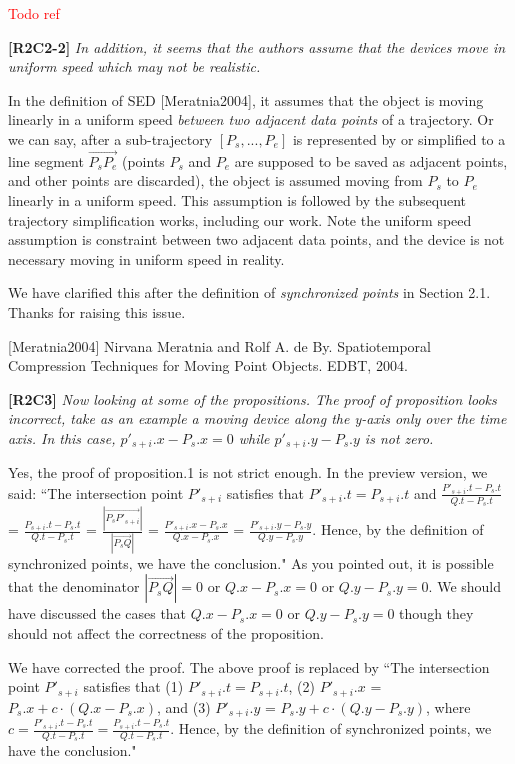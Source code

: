 \documentclass{letter}
\begin{document}
\textcolor{red}{Todo ref}

\textbf{[R2C2-2]} \emph{In addition, it seems that the authors assume that the devices move in uniform speed which may not be realistic.}

In the definition of SED [Meratnia2004], it assumes that the object is moving linearly in a uniform speed \textit{between two adjacent data points} of a trajectory. Or we can say, after a sub-trajectory $[P_s, ..., P_e]$ is represented by or simplified to a line segment $\overrightarrow{P_sP_e}$ (points $P_s$ and $P_e$ are supposed to be saved as adjacent points, and other points are discarded), the object is assumed moving from $P_s$ to $P_e$ linearly in a uniform speed. This assumption is followed by the subsequent trajectory simplification works, including our work. Note the uniform speed assumption is constraint between two adjacent data points, and the device is not necessary moving in uniform speed in reality.

We have clarified this after the definition of \emph{synchronized points} in Section 2.1. Thanks for raising this issue.

[Meratnia2004] Nirvana Meratnia and Rolf A. de By. Spatiotemporal Compression Techniques for Moving Point Objects. EDBT, 2004.


\textbf{[R2C3]} \emph{Now looking at some of the propositions.
The proof of proposition looks incorrect, take as an example a moving device along the y-axis only over the time axis. In this case, $p'_{s+i}.x - P_s.x = 0$ while $p'_{s+i}.y - P_s.y$ is not zero.
}

Yes, the proof of proposition.1 is not strict enough. In the preview version, we said:
``The intersection point $P'_{s+i}$ satisfies that $P'_{s+i}.t = P_{s+i}.t$ and
$\frac{P'_{s+i}.t - P_{s}.t}{Q.t - P_{s}.t}$ = $\frac{P_{s+i}.t - P_{s}.t}{Q.t - P_{s}.t}$  =
$\frac{|\overrightarrow{P_sP'_{s+i}}|}{|\overrightarrow{P_sQ}|}$ =
$\frac{P'_{s+i}.x - P_{s}.x}{Q.x - P_{s}.x}$ =
$\frac{P'_{s+i}.y - P_{s}.y}{Q.y - P_{s}.y}$.
Hence, by the definition of synchronized points, we have the conclusion."
As you pointed out, it is possible that the denominator $|\overrightarrow{P_sQ}|=0$ or $Q.x - P_{s}.x=0$ or $Q.y - P_{s}.y=0$. We should have discussed the cases that $Q.x - P_{s}.x=0$ or $Q.y - P_{s}.y=0$ though they should not affect the correctness of the proposition.

We have corrected the proof. The above proof is replaced by
``The intersection point $P'_{s+i}$ satisfies that
(1) $P'_{s+i}.t = P_{s+i}.t$,
(2) $P'_{s+i}.x$ = $P_s.x +  c\cdot(Q.x - P_s.x)$, and
(3) $P'_{s+i}.y$ = $P_s.y +  c\cdot(Q.y - P_s.y)$,
where $c= \frac{P'_{s+i}.t - P_{s}.t}{Q.t - P_{s}.t}= \frac{P_{s+i}.t-P_s.t}{Q.t-P_s.t}$.
Hence, by the definition of synchronized points, we have the conclusion."
\end{document}
